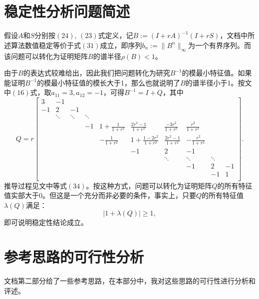 \documentclass[UTF8]{ctexart}
\theoremstyle{plain}
\theoremstyle{definition}
\theoremstyle{remark}
\begin{document}
\section{稳定性分析问题简述}
假设$A$和$S$分别按$(24)$, $(23)$式定义，记$B:=(I+rA)^{-1}(I+rS)$，文档中所述算法数值稳定等价于式$(31)$成立，即序列$b_{n}:=\|B^{n}\|_{\infty}$为一个有界序列。而该问题可以转化为证明矩阵$B$的谱半径$\rho(B)<1$。

由于$B$的表达式较难给出，因此我们把问题转化为研究$B^{-1}$的模最小特征值。如果能证明$B^{-1}$的模最小特征值的模长大于1，那么也就说明了$B$的谱半径小于1。按文中$(16)$式，取$a_{11}=3,a_{12}=-1$，可得$B^{-1}=I+Q$，其中
\begin{equation}
    Q=r\begin{bmatrix}
        3&-1& & & & & & & & \\
        -1&2&-1& & & & & & &\\
        &\ddots&\ddots&\ddots&&&&&&\\
         & & &-1&1+\frac{1}{1+r^2}&\frac{2r^2-1}{1+r^2}&\frac{-3r^2}{1+r^2}&\frac{r^2}{1+r^2}&&\\
         & & & &-\frac{1}{1+r^2}&1+\frac{1-2r^2}{1+r^2}&\frac{2r^2-1}{1+r^2}&-\frac{r^2}{1+r^2}& \\
         & & & & &-1&2&-1& & \\
         & & & & &  &\ddots&\ddots&\ddots& \\
         & & & & & & &-1&2&-1\\
         & & & & & & &  &-1&1\\
    \end{bmatrix}.
\end{equation}
推导过程见文中等式$(34)$。按这种方式，问题可以转化为证明矩阵$Q$的所有特征值实部大于0。但这是一个充分而非必要的条件，事实上，只要$Q$的所有特征值$\lambda(Q)$满足：
\begin{equation}
    |1+\lambda(Q)|\ge 1,
\end{equation}
即可说明稳定性结论成立。
\section{参考思路的可行性分析}
文档第二部分给了一些参考思路，在本部分中，我对这些思路的可行性进行分析和评述。
\end{document}
